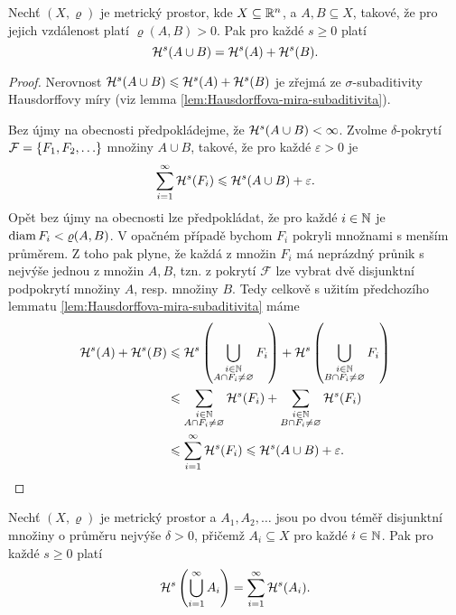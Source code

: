 \begin{lemma}\label{lem:hausdorffova-mira-sigma-aditivita-kladna-vzdalenost}
    Nechť $(X,\varrho)$ je metrický prostor, kde $X\subseteq\mathbb{R}^n$, a $A,B\subseteq X$, takové, že pro jejich vzdálenost platí $\varrho(A,B)>0$. Pak pro každé $s\geqslant 0$ platí
    \[\mathcal{H}^s(A\cup B)=\mathcal{H}^s(A)+\mathcal{H}^s(B).\]
\end{lemma}
\begin{proof}
    Nerovnost $\mathcal{H}^s(A\cup B)\leqslant\mathcal{H}^s(A)+\mathcal{H}^s(B)$ je zřejmá ze $\sigma$-subaditivity Hausdorffovy míry (viz lemma \ref{lem:Hausdorffova-mira-subaditivita}).

    Bez újmy na obecnosti předpokládejme, že $\mathcal{H}^s(A\cup B)<\infty$. Zvolme $\delta$-pokrytí $\mathcal{F}=\left\{F_1,F_2,\ldots\right\}$ množiny $A\cup B$, takové, že pro každé $\varepsilon>0$ je
    \[\sum_{i=1}^{\infty}\mathcal{H}^s(F_i)\leqslant\mathcal{H}^s(A\cup B)+\varepsilon.\]
    Opět bez újmy na obecnosti lze předpokládat, že pro každé $i\in\mathbb{N}$ je $\operatorname{diam}{F_i}<\varrho(A,B)$. V opačném případě bychom $F_i$ pokryli množnami s menším průměrem. Z toho pak plyne, že každá z množin $F_i$ má neprázdný průnik s nejvýše jednou z množin $A,B$, tzn. z pokrytí $\mathcal{F}$ lze vybrat dvě disjunktní podpokrytí množiny $A$, resp. množiny $B$. Tedy celkově s užitím předchozího lemmatu \ref{lem:Hausdorffova-mira-subaditivita} máme
    \begin{align*}
        \mathcal{H}^s(A)+\mathcal{H}^s(B)&\leqslant\mathcal{H}^s\left(\bigcup_{\substack{i\in\mathbb{N}\\ A\cap F_i\neq\varnothing}}F_i\right)+\mathcal{H}^s\left(\bigcup_{\substack{i\in\mathbb{N}\\ B\cap F_i\neq\varnothing}}F_i\right)\\
        &\leqslant\sum_{\substack{i\in\mathbb{N}\\ A\cap F_i\neq\varnothing}}\mathcal{H}^s(F_i)+\sum_{\substack{i\in\mathbb{N}\\ B\cap F_i\neq\varnothing}}\mathcal{H}^s(F_i)\\
        &\leqslant\sum_{i=1}^{\infty}\mathcal{H}^s(F_i)\leqslant\mathcal{H}^s(A\cup B)+\varepsilon.
    \end{align*}
\end{proof}
\begin{lemma}\label{lem:hausdorffova-mira-sigma-aditivita-temer-disjunktni}
    Nechť $(X,\varrho)$ je metrický prostor a $A_1,A_2,\ldots$ jsou po dvou téměř disjunktní množiny o průměru nejvýše $\delta>0$, přičemž $A_i\subseteq X$ pro každé $i\in\mathbb{N}$. Pak pro každé $s\geqslant 0$ platí
    \[\mathcal{H}^s\left(\bigcup_{i=1}^\infty A_i\right)=\sum_{i=1}^{\infty}\mathcal{H}^s(A_i).\]
\end{lemma}
